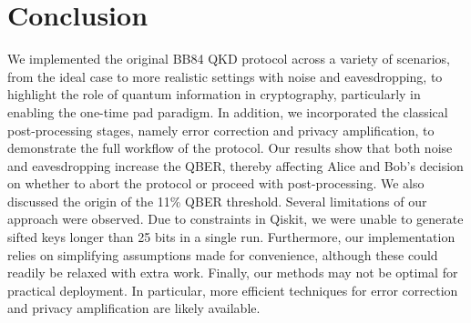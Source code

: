 \section{Conclusion} \label{conclusion}

We implemented the original BB84 QKD protocol across a variety of scenarios, from the ideal case to more realistic settings with noise and eavesdropping, to highlight the role of quantum information in cryptography, particularly in enabling the one-time pad paradigm.
In addition, we incorporated the classical post-processing stages, namely error correction and privacy amplification, to demonstrate the full workflow of the protocol. Our results show that both noise and eavesdropping increase the QBER, thereby affecting Alice and Bob’s decision on whether to abort the protocol or proceed with post-processing. We also discussed the origin of the 11\% QBER threshold.
Several limitations of our approach were observed. Due to constraints in Qiskit, we were unable to generate sifted keys longer than 25 bits in a single run. 
Furthermore, our implementation relies on simplifying assumptions made for convenience, although these could readily be relaxed with extra work. 
Finally, our methods may not be optimal for practical deployment. In particular, more efficient techniques for error correction and privacy amplification are likely available.



